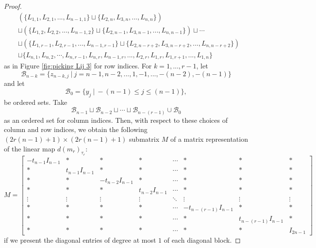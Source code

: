 \documentclass[reqno]{amsart}
\theoremstyle{definition}
\numberwithin{equation}{section}
\begin{document}
\begin{proof}
\begin{equation*}
    \begin{aligned}
        &(\{L_{1,1}, L_{2,1},...,L_{n-1,1}\} \sqcup \{L_{2,n},L_{3,n},...,L_{n,n}\})\\
        &\sqcup (\{L_{1,2}, L_{2,2},...,L_{n-1,2}\}\sqcup \{L_{2,n-1},L_{3,n-1},...,L_{n,n-1}\})\sqcup \cdots\\
        & \sqcup (\{L_{1,r-1}, L_{2,r-1},...,L_{n-1,r-1}\} \sqcup \{L_{2,n-r+2},L_{3,n-r+2},...,L_{n,n-r+2}\})\\
        &\sqcup \{L_{n,1},L_{n,2},\cdots, L_{n,r-1}, L_{n,r}, L_{n-1,r},...,L_{2,r},L_{1,r},L_{1,r+1},...,L_{1,n}\}
    \end{aligned}
    \end{equation*}
    as in Figure \ref{fig:picking Lij 3} for row indices. For $k=1,...,r-1$, let
    \begin{equation*}
        \mathcal{B}_{n-k}=\{z_{n-k,j}~|~j=n-1,n-2,...,1,-1,...,-(n-2),-(n-1)\}
    \end{equation*}
    and let
    \begin{equation*}
        \mathcal{B}_0=\{y_{j}~|~-(n-1) \leq j \leq (n-1)\},
    \end{equation*}
    be ordered sets. Take
    \begin{equation*}
        \mathcal{B}_{n-1} \sqcup \mathcal{B}_{n-2} \sqcup \cdots \sqcup \mathcal{B}_{n-(r-1)} \cup \mathcal{B}_0
    \end{equation*}
    as an ordered set for column indices. Then, with respect to these choices of column and row indices, we obtain the following $(2r(n-1)+1) \times (2r(n-1)+1)$ submatrix $M$ of a matrix representation of the linear map $d(m_r)_{\tau_r}$:
    \begin{equation*}
        M=\left[\begin{array}{cc|cc|c|cc|c}
            -t_{n-1}I_{n-1} & * & * & * & \cdots   & * &  * & * \\
            * & t_{n-1}I_{n-1} & * & * & \cdots  & * &  * & * \\ \hline
            * & * & -t_{n-2}I_{n-1} & * & \cdots & * & * & * \\
            * & * & * & t_{n-2}I_{n-1} & \cdots & * & * & * \\ \hline
            \vdots & \vdots &  \vdots & \vdots & \ddots & \vdots & \vdots & \vdots \\ \hline
            * & * & * & * & \cdots & -t_{n-(r-1)}I_{n-1} & * & *\\
             * & * & * & * & \cdots & * & t_{n-(r-1)}I_{n-1} & *\\ \hline
             * & * & * & * &\cdots & * & * & I_{2n-1}
        \end{array}\right]
    \end{equation*}
     if we present the diagonal entries of degree at most $1$ of each diagonal block. 
    

\end{proof}
\end{document}
